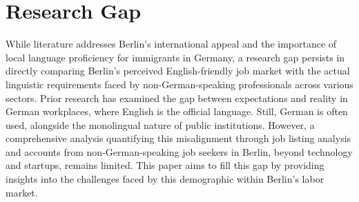 \section{Research Gap}
While literature addresses Berlin’s international appeal and the importance of local language proficiency for immigrants in Germany, a research gap persists in directly comparing Berlin’s perceived English-friendly job market with the actual linguistic requirements faced by non-German-speaking professionals across various sectors. Prior research has examined the gap between expectations and reality in German workplaces, where English is the official language. Still, German is often used, alongside the monolingual nature of public institutions. However, a comprehensive analysis quantifying this misalignment through job listing analysis and accounts from non-German-speaking job seekers in Berlin, beyond technology and startups, remains limited. This paper aims to fill this gap by providing insights into the challenges faced by this demographic within Berlin’s labor market.\par